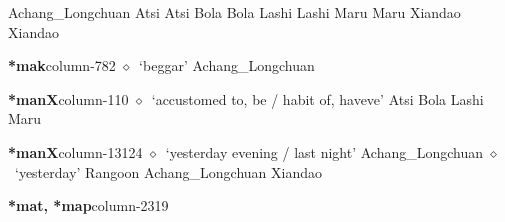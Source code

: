 \hspace{1ex}
         Achang\_Longchuan 
\hspace{1ex}
         Atsi 
\hspace{1ex}
         Atsi 
\hspace{1ex}
         Bola 
\hspace{1ex}
         Bola 
\hspace{1ex}
         Lashi 
\hspace{1ex}
         Lashi 
\hspace{1ex}
         Maru 
\hspace{1ex}
         Maru 
\hspace{1ex}
         Xiandao 
\hspace{1ex}
         Xiandao 
  \item {\footnotesize \textbf{*mak}}{\tiny column-782}
         $\diamond$~`beggar'
         Achang\_Longchuan 
  \item {\footnotesize \textbf{*manX}}{\tiny column-110}
         $\diamond$~`accustomed to, be / habit of, haveve'
         Atsi 
\hspace{1ex}
         Bola 
\hspace{1ex}
         Lashi 
\hspace{1ex}
         Maru 
  \item {\footnotesize \textbf{*manX}}{\tiny column-13124}
         $\diamond$~`yesterday evening / last night'
         Achang\_Longchuan 
\hspace{1ex}
         $\diamond$~`yesterday'
         Rangoon 
\hspace{1ex}
         Achang\_Longchuan 
\hspace{1ex}
         Xiandao 
  \item {\footnotesize \textbf{*mat, *map}}{\tiny column-2319}
